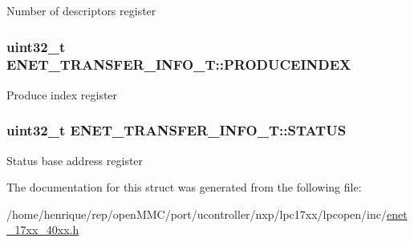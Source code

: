 Number of descriptors register \hypertarget{structENET__TRANSFER__INFO__T_ab8f942719d586cb8d735dbe57341bc10}{
\subsubsection[{P\-R\-O\-D\-U\-C\-E\-I\-N\-D\-E\-X}]{ uint32\-\_\-t E\-N\-E\-T\-\_\-\-T\-R\-A\-N\-S\-F\-E\-R\-\_\-\-I\-N\-F\-O\-\_\-\-T\-::\-P\-R\-O\-D\-U\-C\-E\-I\-N\-D\-E\-X}}\label{structENET__TRANSFER__INFO__T_ab8f942719d586cb8d735dbe57341bc10}
Produce index register \hypertarget{structENET__TRANSFER__INFO__T_ae72bffa37688d592667997f276ff28e2}{
\subsubsection[{S\-T\-A\-T\-U\-S}]{ uint32\-\_\-t E\-N\-E\-T\-\_\-\-T\-R\-A\-N\-S\-F\-E\-R\-\_\-\-I\-N\-F\-O\-\_\-\-T\-::\-S\-T\-A\-T\-U\-S}}\label{structENET__TRANSFER__INFO__T_ae72bffa37688d592667997f276ff28e2}
Status base address register 

The documentation for this struct was generated from the following file\-:\begin{DoxyCompactItemize}
\item 
/home/henrique/rep/open\-M\-M\-C/port/ucontroller/nxp/lpc17xx/lpcopen/inc/\hyperlink{enet__17xx__40xx_8h}{enet\-\_\-17xx\-\_\-40xx.\-h}\end{DoxyCompactItemize}
